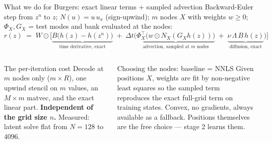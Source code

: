 \documentclass[10pt,aspectratio=169]{beamer}
\newcommand{\T}{^{\top}}
\begin{document}
\begin{frame}{What we do for Burgers: exact linear terms + sampled advection}
  \small Backward-Euler step from $z^n$ to $z$; $N(u)=u\,u_x$ (sign-upwind); $m$ nodes $X$ with weights $w\ge0$; $\Phi_X,G_X$ = test modes and bank evaluated at the nodes:
  \[
    r(z) \;=\; W\odot\Big[\underbrace{B\big(h(z)-h(z^n)\big)}_{\text{time derivative, exact}}
    \;+\;\Delta t\Big(\underbrace{\Phi_X\T\big(w\odot N_X(G_X h(z))\big)}_{\text{advection, sampled at } m \text{ nodes}}
    \;+\;\underbrace{\nu\,\Lambda\,B\,h(z)}_{\text{diffusion, exact}}\Big)\Big]
  \]
  \begin{columns}[T]
    \begin{block}{The per-iteration cost}
      Decode at $m$ nodes only ($m\times R$), one upwind stencil on $m$ values, an $M\times m$ matvec, and the exact linear part. \textbf{Independent of the grid size $n$.} Measured: latent solve flat from $N=128$ to $4096$.
    \end{block}
    \begin{exampleblock}{Choosing the nodes: baseline = NNLS}
      Given positions $X$, weights are fit by non-negative least squares so the sampled term reproduces the exact full-grid term on training states. Convex, no gradients, always available as a fallback. Positions themselves are the free choice --- stage 2 learns them.
    \end{exampleblock}
  \end{columns}
\end{frame}
\end{document}
